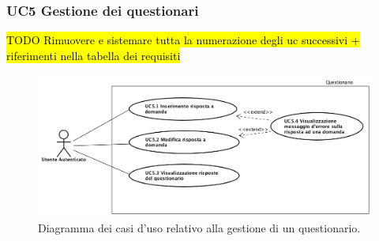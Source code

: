 	\subsubsection{UC5 Gestione dei questionari}
	\hl{TODO Rimuovere e sistemare tutta la numerazione degli uc successivi + riferimenti nella tabella dei requisiti}
		\label{section:UC5}	
			\begin{figure}[H]
				\begin{center}
					\includegraphics[width=15cm]{Pics/UC5QuestionarioUtenteAutenticato.png}
					\caption{Diagramma dei casi d'uso relativo alla gestione di un questionario.}
					\label{fig:UC5_Qestionari}
				\end{center}
			\end{figure}
			
